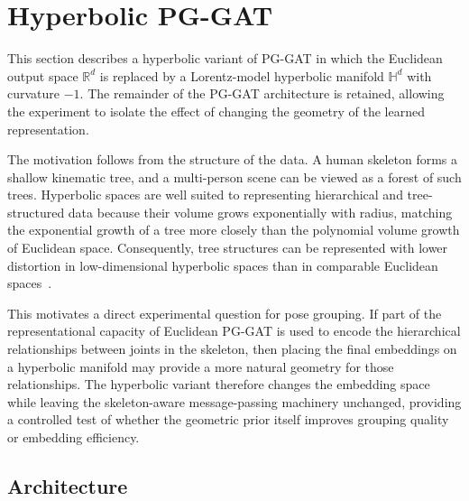 \section{Hyperbolic PG-GAT}
\label{sec_meth_hyperbolic}

This section describes a hyperbolic variant of PG-GAT in which the
Euclidean output space $\mathbb{R}^{d}$ is replaced by a Lorentz-model
hyperbolic manifold $\mathbb{H}^{d}$ with curvature $-1$.
The remainder of the PG-GAT architecture is retained,
allowing the experiment to isolate the effect of changing the geometry
of the learned representation.

The motivation follows from the structure of the data.
A human skeleton forms a shallow kinematic tree,
and a multi-person scene can be viewed as a forest of such trees.
Hyperbolic spaces are well suited to representing hierarchical
and tree-structured data because their volume grows exponentially
with radius,
matching the exponential growth of a tree more closely
than the polynomial volume growth of Euclidean space.
Consequently,
tree structures can be represented with lower distortion
in low-dimensional hyperbolic spaces than in comparable
Euclidean spaces~\cite{sarkar2011treeembed, sala2018learningmrep}.

This motivates a direct experimental question for pose grouping.
If part of the representational capacity of Euclidean PG-GAT
is used to encode the hierarchical relationships between joints
in the skeleton,
then placing the final embeddings on a hyperbolic manifold
may provide a more natural geometry for those relationships.
The hyperbolic variant therefore changes the embedding space
while leaving the skeleton-aware message-passing machinery unchanged,
providing a controlled test of whether the geometric prior itself
improves grouping quality or embedding efficiency.

\subsection{Architecture}
\label{sec_meth_hyperbolic_arch}

